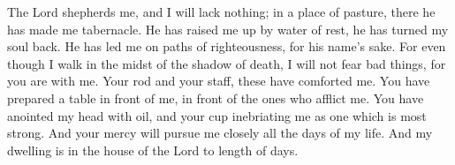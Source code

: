 The Lord shepherds me, and I will lack nothing; in a place of pasture, there he has made me tabernacle. He has raised me up by water of rest, he has turned my soul back. He has led me on paths of righteousness, for his name's sake. For even though I walk in the midst of the shadow of death, I will not fear bad things, for you are with me. Your rod and your staff, these have comforted me. You have prepared a table in front of me, in front of the ones who afflict me. You have anointed my head with oil, and your cup inebriating me as one which is most strong. And your mercy will pursue me closely all the days of my life. And my dwelling is in the house of the Lord to length of days.